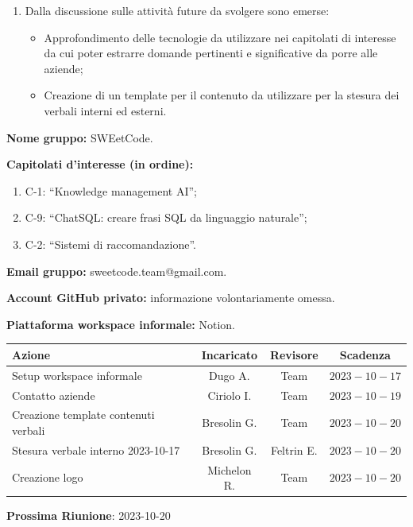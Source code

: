 \documentclass{article}
\begin{document}
\begin{paracol}{2}
\begin{enumerate}
    \item Dalla discussione sulle attività future da svolgere sono emerse:
    \begin{itemize}
        \item Approfondimento delle tecnologie da utilizzare nei capitolati di interesse da cui poter estrarre domande pertinenti e significative da porre alle aziende;
        \item Creazione di un template per il contenuto da utilizzare per la stesura dei verbali interni ed esterni.
    \end{itemize}
\end{enumerate}


\newpage


\textbf{Nome gruppo:} SWEetCode.

\textbf{Capitolati d'interesse (in ordine):}
\begin{enumerate}
    \item C-1: “Knowledge management AI”;
    \item C-9: “ChatSQL: creare frasi SQL da linguaggio naturale”;
    \item C-2: “Sistemi di raccomandazione”.
\end{enumerate}

\textbf{Email gruppo:} sweetcode.team@gmail.com.

\textbf{Account GitHub privato:} informazione volontariamente omessa.

\textbf{Piattaforma workspace informale:} Notion.

\end{paracol}

\vspace{3cm}




{\renewcommand{\arraystretch}{1.5}
\begin{tabularx}{\textwidth}{X|c|c|c}
\textbf{Azione} & \textbf{Incaricato} & \textbf{Revisore} & \textbf{Scadenza} \\
\hline
Setup workspace informale & Dugo A. & Team & $2023-10-17$ \\
\hline
Contatto aziende & Ciriolo I. & Team & $2023-10-19$ \\
\hline
Creazione template contenuti verbali & Bresolin G. & Team & $2023-10-20$ \\
\hline
Stesura verbale interno 2023-10-17 & Bresolin G. & Feltrin E. & $2023-10-20$ \\
\hline
Creazione logo & Michelon R. & Team & $2023-10-20$ \\
\end{tabularx}}
\vspace{3cm}


\textbf{Prossima Riunione}: 2023-10-20
\end{document}
